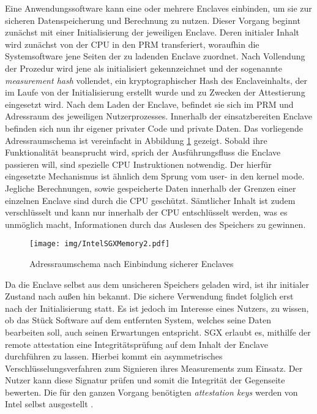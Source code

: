 Eine Anwendungssoftware kann eine oder mehrere Enclaves einbinden, um sie zur sicheren Datenspeicherung und Berechnung zu nutzen. Dieser Vorgang beginnt zunächst mit einer Initialisierung der jeweiligen Enclave. Deren initialer Inhalt wird zunächst von der CPU in den PRM transferiert, woraufhin die Systemsoftware jene Seiten der zu ladenden Enclave zuordnet. Nach Vollendung der Prozedur wird jene als initialisiert gekennzeichnet und der sogenannte \textit{measurement hash} vollendet, ein kryptographischer Hash des Enclaveinhalts, der im Laufe von der Initialisierung erstellt wurde und zu Zwecken der Attestierung eingesetzt wird. Nach dem Laden der Enclave, befindet sie sich im PRM und Adressraum des jeweiligen Nutzerprozesses. Innerhalb der einsatzbereiten Enclave befinden sich nun ihr eigener privater Code und private Daten. Das vorliegende Adressraumschema ist vereinfacht in Abbildung \ref{fig:intelsgxmemory2} gezeigt. Sobald ihre Funktionalität beansprucht wird, sprich der Ausführungsfluss die Enclave passieren will, sind spezielle CPU Instruktionen notwendig. Der hierfür eingesetzte Mechanismus ist ähnlich dem Sprung vom user- in den kernel mode. Jegliche Berechnungen, sowie gespeicherte Daten innerhalb der Grenzen einer einzelnen Enclave sind durch die CPU geschützt. Sämtlicher Inhalt ist zudem verschlüsselt und kann nur innerhalb der CPU entschlüsselt werden, was es unmöglich macht, Informationen durch das Auslesen des Speichers zu gewinnen.

\begin{figure}
	\texttt{[image: img/IntelSGXMemory2.pdf]}
	\centering
	\caption{Adressraumschema nach Einbindung sicherer Enclaves}
	\label{fig:intelsgxmemory2}
\end{figure}

Da die Enclave selbst aus dem unsicheren Speichers geladen wird, ist ihr initialer Zustand nach außen hin bekannt. Die sichere Verwendung findet folglich erst nach der Initialisierung statt. Es ist jedoch im Interesse eines Nutzers, zu wissen, ob das Stück Software auf dem entfernten System, welches seine Daten bearbeiten soll, auch seinen Erwartungen entspricht. SGX erlaubt es, mithilfe der remote attestation eine Integritätsprüfung auf dem Inhalt der Enclave durchführen zu lassen. Hierbei kommt ein asymmetrisches Verschlüsselungsverfahren zum Signieren ihres Measurements zum Einsatz. Der Nutzer kann diese Signatur prüfen und somit die Integrität der Gegenseite bewerten. Die für den ganzen Vorgang benötigten \textit{attestation keys} werden von Intel selbst ausgestellt \cite{Johnson2016}.

